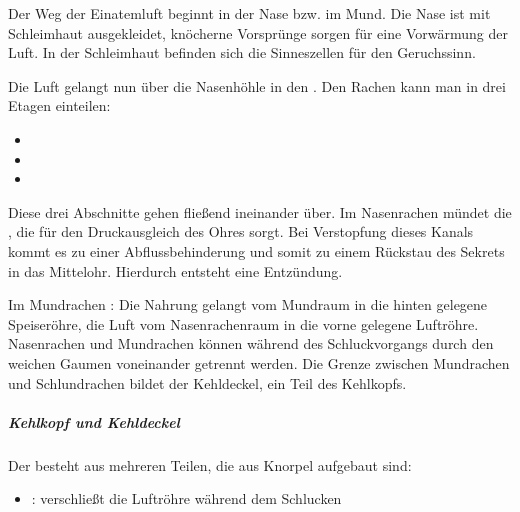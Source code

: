 {%
Der Weg der Einatemluft beginnt in der Nase bzw. im Mund. Die Nase ist
mit Schleimhaut ausgekleidet, knöcherne Vorsprünge sorgen für
eine Vorwärmung der Luft. In der Schleimhaut be\-finden sich die
Sinneszellen für den Geruchssinn. 



Die Luft gelangt nun über die Nasenhöhle in den 
. Den Rachen kann man in drei Etagen
einteilen:
\begin{itemize}
  \item {} 
  \item {} 
  \item {} 
\end{itemize}
Diese drei Abschnitte gehen fließend ineinander über. Im
Nasenrachen mündet die , die für den Druckausgleich
des Ohres sorgt. Bei Verstopfung dieses Kanals kommt es zu
einer Abflussbehinderung und somit zu einem Rückstau des
Sekrets in das Mittelohr. Hierdurch entsteht eine
Entzündung.

Im Mundrachen : Die Nahrung gelangt vom
Mundraum in die hinten gelegene Speiseröhre, die Luft
vom Nasenrachenraum in die vorne gelegene Luftröhre.
Nasenrachen und Mundrachen können während des
Schluckvorgangs durch den weichen Gaumen voneinander
getrennt werden. Die Grenze zwischen Mundrachen und
Schlundrachen bildet der Kehldeckel, ein Teil des Kehlkopfs.

\subparagraph{Kehlkopf und Kehldeckel}
Der  besteht aus mehreren Teilen, die aus
Knorpel aufgebaut sind:
\begin{itemize}
  \item {} : 
  verschließt die Luftröhre während dem Schlucken
\end{itemize}

}
